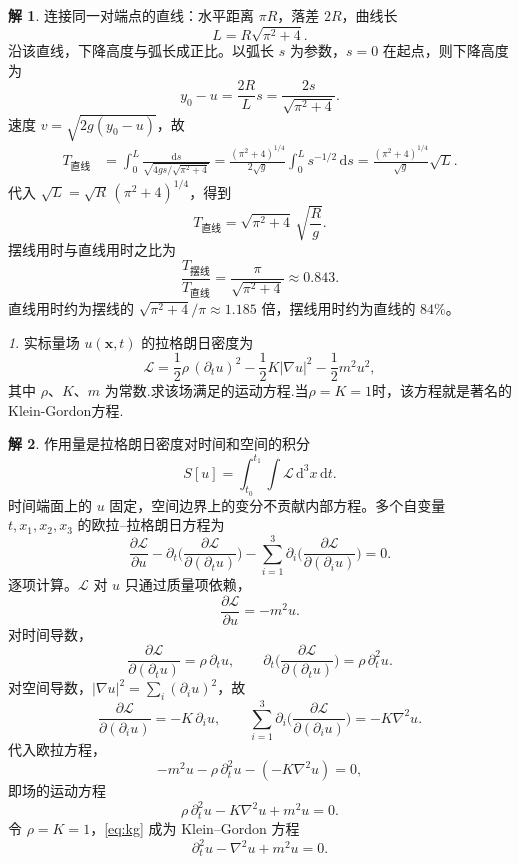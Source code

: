 \documentclass[11pt]{article}
\theoremstyle{remark}
\newtheorem{problem}{}
\theoremstyle{definition}
\newtheorem{solution}{解}
\begin{document}
\begin{solution}
连接同一对端点的直线：水平距离 $\pi R$，落差 $2R$，曲线长
\[
L=R\sqrt{\pi^2+4}.
\]
沿该直线，下降高度与弧长成正比。以弧长 $s$ 为参数，$s=0$ 在起点，则下降高度为
\[
y_0-u=\frac{2R}{L}s=\frac{2s}{\sqrt{\pi^2+4}}.
\]
速度 $v=\sqrt{2g(y_0-u)}$，故
\begin{align*}
T_{\text{直线}}
&=\int_0^{L}\frac{\mathrm{d}s}{\sqrt{4gs/\sqrt{\pi^2+4}}}
=\frac{(\pi^2+4)^{1/4}}{2\sqrt{g}}\int_0^{L}s^{-1/2}\,\mathrm{d}s
=\frac{(\pi^2+4)^{1/4}}{\sqrt{g}}\sqrt{L}.
\end{align*}
代入 $\sqrt{L}=\sqrt{R}\,(\pi^2+4)^{1/4}$，得到
\[
T_{\text{直线}}=\sqrt{\pi^2+4}\,\sqrt{\frac{R}{g}}.
\]
摆线用时与直线用时之比为
\[
\frac{T_{\text{摆线}}}{T_{\text{直线}}}
=\frac{\pi}{\sqrt{\pi^2+4}}\approx 0.843.
\]
直线用时约为摆线的 $\sqrt{\pi^2+4}/\pi\approx 1.185$ 倍，摆线用时约为直线的 $84\%$。
\end{solution}

\begin{problem}
实标量场 $u(\mathbf{x},t)$ 的拉格朗日密度为
$$
\mathcal{L}
=\frac12\rho\,(\partial_t u)^2
-\frac12 K|\nabla u|^2
-\frac12 m^2 u^2,
$$
其中 $\rho$、$K$、$m$ 为常数.求该场满足的运动方程.当$\rho=K=1$时，该方程就是著名的Klein-Gordon方程.
\end{problem}

\begin{solution}
作用量是拉格朗日密度对时间和空间的积分
\[
S[u]=\int_{t_0}^{t_1}\int \mathcal{L}\,\mathrm{d}^3x\,\mathrm{d}t.
\]
时间端面上的 $u$ 固定，空间边界上的变分不贡献内部方程。多个自变量 $t,x_1,x_2,x_3$ 的欧拉--拉格朗日方程为
\[
\frac{\partial\mathcal{L}}{\partial u}
-\partial_t\Biggl(\frac{\partial\mathcal{L}}{\partial(\partial_t u)}\Biggr)
-\sum_{i=1}^{3}\partial_i\Biggl(\frac{\partial\mathcal{L}}{\partial(\partial_i u)}\Biggr)
=0.
\]
逐项计算。$\mathcal{L}$ 对 $u$ 只通过质量项依赖，
\[
\frac{\partial\mathcal{L}}{\partial u}=-m^2 u.
\]
对时间导数，
\[
\frac{\partial\mathcal{L}}{\partial(\partial_t u)}=\rho\,\partial_t u,
\qquad
\partial_t\Biggl(\frac{\partial\mathcal{L}}{\partial(\partial_t u)}\Biggr)=\rho\,\partial_t^2 u.
\]
对空间导数，$|\nabla u|^2=\sum_i(\partial_i u)^2$，故
\[
\frac{\partial\mathcal{L}}{\partial(\partial_i u)}=-K\,\partial_i u,
\qquad
\sum_{i=1}^{3}\partial_i\Biggl(\frac{\partial\mathcal{L}}{\partial(\partial_i u)}\Biggr)
=-K\nabla^2 u.
\]
代入欧拉方程，
\[
-m^2 u-\rho\,\partial_t^2 u-(-K\nabla^2 u)=0,
\]
即场的运动方程
\begin{equation}
\rho\,\partial_t^2 u-K\nabla^2 u+m^2 u=0.
\label{eq:kg}
\end{equation}
令 $\rho=K=1$，\eqref{eq:kg} 成为 Klein--Gordon 方程
\[
\partial_t^2 u-\nabla^2 u+m^2 u=0.
\]
\end{solution}
\end{document}
